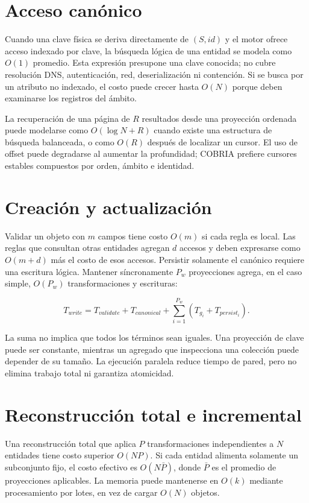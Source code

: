 \section{Acceso canónico}

Cuando una clave física se deriva directamente de $(S,id)$ y el motor ofrece acceso
indexado por clave, la búsqueda lógica de una entidad se modela como $O(1)$ promedio.
Esta expresión presupone una clave conocida; no cubre resolución DNS, autenticación,
red, deserialización ni contención. Si se busca por un atributo no indexado, el costo
puede crecer hasta $O(N)$ porque deben examinarse los registros del ámbito.

La recuperación de una página de $R$ resultados desde una proyección ordenada puede
modelarse como $O(\log N+R)$ cuando existe una estructura de búsqueda balanceada, o como
$O(R)$ después de localizar un cursor. El uso de offset puede degradarse al aumentar la
profundidad; COBRIA prefiere cursores estables compuestos por orden, ámbito e identidad.

\section{Creación y actualización}

Validar un objeto con $m$ campos tiene costo $O(m)$ si cada regla es local. Las reglas
que consultan otras entidades agregan $d$ accesos y deben expresarse como
$O(m+d)$ más el costo de esos accesos. Persistir solamente el canónico requiere una
escritura lógica. Mantener síncronamente $P_w$ proyecciones agrega, en el caso simple,
$O(P_w)$ transformaciones y escrituras:

\begin{equation}
T_{write}=T_{validate}+T_{canonical}+\sum_{i=1}^{P_w}
  (T_{g_i}+T_{persist_i}).
\label{eq:tiempo-escritura}
\end{equation}

La suma no implica que todos los términos sean iguales. Una proyección de clave puede
ser constante, mientras un agregado que inspecciona una colección puede depender de su
tamaño. La ejecución paralela reduce tiempo de pared, pero no elimina trabajo total ni
garantiza atomicidad.

\section{Reconstrucción total e incremental}

Una reconstrucción total que aplica $P$ transformaciones independientes a $N$ entidades
tiene costo superior $O(NP)$. Si cada entidad alimenta solamente un subconjunto fijo,
el costo efectivo es $O(N\bar{P})$, donde $\bar{P}$ es el promedio de proyecciones
aplicables. La memoria puede mantenerse en $O(k)$ mediante procesamiento por lotes, en
vez de cargar $O(N)$ objetos.

